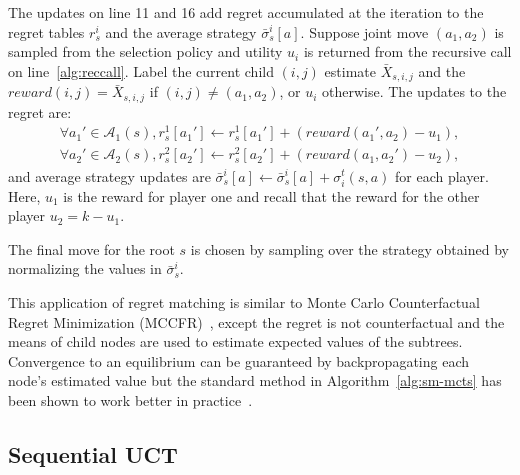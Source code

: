 \documentclass[conference]{IEEEtran}
\newcommand{\cA}{\mathcal{A}}
\begin{document}
The updates on line 11 and 16 add regret accumulated at the iteration to  
the regret tables $r^i_s$ and the average strategy $\bar{\sigma}^i_s[a]$. 
Suppose joint move $(a_1,a_2)$ is 
sampled from the selection policy and utility $u_i$ is returned from the recursive call on line~\ref{alg:reccall}. 
Label the current child $(i,j)$ estimate $\bar{X}_{s,i,j}$ and the $reward(i,j) = \bar{X}_{s,i,j}$ if 
$(i,j) \not= (a_1,a_2)$, or $u_i$ otherwise. The updates to the regret are:
\begin{eqnarray*}
\forall a_1' \in \cA_1(s),  r^1_s[a_1'] \leftarrow r^1_s[a_1'] + ( reward(a_1', a_2) - u_1 ),\\
\forall a_2' \in \cA_2(s),  r^2_s[a_2'] \leftarrow r^2_s[a_2'] + ( reward(a_1, a_2') - u_2 ),
\end{eqnarray*}
\noindent and average strategy updates are $\bar{\sigma}^i_s[a] \leftarrow \bar{\sigma}^i_s[a] + \sigma^t_i(s,a)$ 
for each player. Here, $u_1$ is the reward for player one and recall that the reward for the other player $u_2 = k - u_1$.

The final move for the root $s$ is chosen by sampling over the strategy obtained by 
normalizing the values in $\bar{\sigma}_s^i$.  

This application of regret matching is similar to Monte Carlo Counterfactual Regret 
Minimization (MCCFR)~\cite{Lanctot09mccfr}, except the regret is not counterfactual and the means of
child nodes are used to estimate expected values of the subtrees. Convergence to an equilibrium can be guaranteed
by backpropagating each node's estimated value but the standard method in Algorithm~\ref{alg:sm-mcts} has been 
shown to work better in practice~\cite{Lisy13Computing}. 

\subsection{Sequential UCT}
\end{document}
